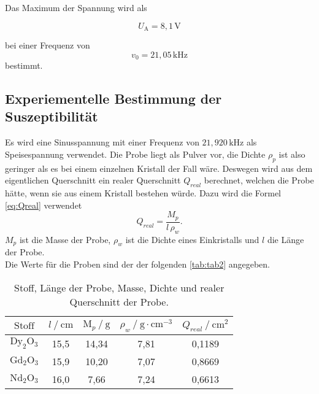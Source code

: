 Das Maximum der Spannung wird als

\begin{equation*}
    U_\text{A} = 8,1 \, \unit{\volt}
\end{equation*}

bei einer Frequenz von 
\begin{equation*}
    v_0 = 21,05 \, \unit{\kilo\hertz}
\end{equation*}
bestimmt.



\subsection{Experiementelle Bestimmung der Suszeptibilität}

Es wird eine Sinusspannung mit einer Frequenz von $ 21,920 \, \unit{\kilo\hertz}$ als Speisespannung verwendet.
Die Probe liegt als Pulver vor, die Dichte $ \rho_p$ ist also geringer als es bei einem einzelnen Kristall der Fall wäre.
Deswegen wird aus dem eigentlichen Querschnitt ein realer Querschnitt $Q_{real} $ berechnet, welchen die Probe hätte, wenn sie aus einem Kristall bestehen würde.
Dazu wird die Formel \eqref{eq:Qreal} verwendet
\begin{equation}
    Q_{real} = \frac{M_p}{l \, \rho_w} .
    \label{eq:Qreal}
\end{equation}
$M_p$ ist die Masse der Probe, $\rho_w$ ist die Dichte eines Einkristalls und $l$ die Länge der Probe. \\

Die Werte für die Proben sind der der folgenden \autoref{tab:tab2} angegeben.


\begin{table}[H]
    \centering
    \caption{Stoff, Länge der Probe, Masse, Dichte und realer Querschnitt der Probe.}
    \label{tab:tab2}
    \begin{tabular}{S S S S S}
      \toprule
        {$\text{Stoff}$}&{$l \mathbin{/} \unit{\centi\meter} $}&{$\text{M}_p \mathbin{/} \unit{\gram} $}&{$ \rho_w \mathbin{/} \unit{\gram} \cdot \unit{\centi\meter}^{-3}$}&{$Q_{real} \mathbin{/} \unit{\centi\meter}^{2}$}\\
        \midrule
        {$\text{Dy}_2 \text{O}_3$} & {15,5}& {14,34}&{7,81\cite{ap07}}&{0,1189}\\
        {$\text{Gd}_2 \text{O}_3$} & {15,9}& {10,20}&{7,07\cite{ap07}}&{0,8669}\\
        {$\text{Nd}_2 \text{O}_3$} & {16,0}& {7,66 }&{7,24\cite{ap07}}&{0,6613}\\
      \bottomrule
    \end{tabular}
\end{table}


